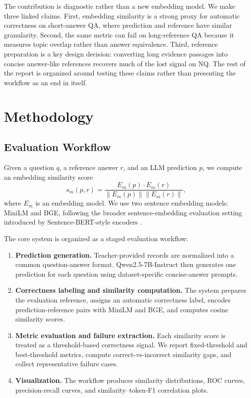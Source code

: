 \documentclass[11pt]{article}
\begin{document}
The contribution is diagnostic rather than a new embedding model. We make three linked claims. First, embedding similarity is a strong proxy for automatic correctness on short-answer QA, where prediction and reference have similar granularity. Second, the same metric can fail on long-reference QA because it measures topic overlap rather than answer equivalence. Third, reference preparation is a key design decision: converting long evidence passages into concise answer-like references recovers much of the lost signal on NQ. The rest of the report is organized around testing these claims rather than presenting the workflow as an end in itself.

\section{Methodology}

\subsection{Evaluation Workflow}

Given a question $q$, a reference answer $r$, and an LLM prediction $p$, we compute an embedding similarity score
\begin{equation}
s_m(p,r) =
\frac{E_m(p) \cdot E_m(r)}
{\lVert E_m(p) \rVert \lVert E_m(r) \rVert},
\end{equation}
where $E_m$ is an embedding model. We use two sentence embedding models: MiniLM and BGE, following the broader sentence-embedding evaluation setting introduced by Sentence-BERT-style encoders \citep{reimers-gurevych-2019-sentencebert}.

The core system is organized as a staged evaluation workflow:
\begin{enumerate}
    \item \textbf{Prediction generation.} Teacher-provided records are normalized into a common question-answer format. Qwen2.5-7B-Instruct then generates one prediction for each question using dataset-specific concise-answer prompts.
    \item \textbf{Correctness labeling and similarity computation.} The system prepares the evaluation reference, assigns an automatic correctness label, encodes prediction-reference pairs with MiniLM and BGE, and computes cosine similarity scores.
    \item \textbf{Metric evaluation and failure extraction.} Each similarity score is treated as a threshold-based correctness signal. We report fixed-threshold and best-threshold metrics, compute correct-vs-incorrect similarity gaps, and collect representative failure cases.
    \item \textbf{Visualization.} The workflow produces similarity distributions, ROC curves, precision-recall curves, and similarity--token-F1 correlation plots.
\end{enumerate}
\end{document}
